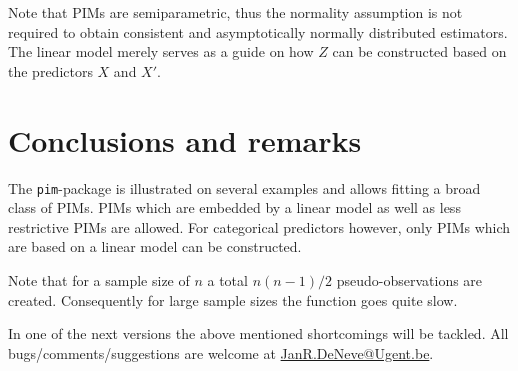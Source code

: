 \documentclass[12pt]{article}
\begin{document}
Note that PIMs are semiparametric, thus the normality assumption is not required to obtain consistent and asymptotically normally distributed estimators. The linear model merely serves as a guide on how $Z$ can be constructed based on the predictors $X$ and $X'$.

\section{Conclusions and remarks}\label{S_conclusion}


The \texttt{pim}-package is illustrated on several examples and allows fitting a broad class of PIMs. PIMs which are embedded by a linear model as well as less restrictive PIMs are allowed. For categorical predictors however, only PIMs which are based on a linear model can be constructed.


Note that for a sample size of $n$ 	a total $n(n-1)/2$ pseudo-observations are created. Consequently for large sample sizes the function goes quite slow.  

In one of the next versions the above mentioned shortcomings will be tackled. All bugs/comments/suggestions are welcome at %
\href{mailto:JanR.DeNeve@Ugent.be}{JanR.DeNeve@Ugent.be}.




\end{document}
